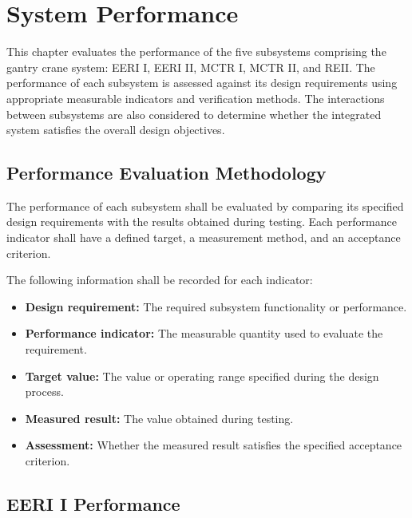 
\chapter{System Performance}
\label{ch:system-performance}

This chapter evaluates the performance of the five subsystems
comprising the gantry crane system: EERI I, EERI II, MCTR I,
MCTR II, and REII. The performance of each subsystem is assessed
against its design requirements using appropriate measurable
indicators and verification methods. The interactions between
subsystems are also considered to determine whether the integrated
system satisfies the overall design objectives.

\section{Performance Evaluation Methodology}
\label{sec:performance-methodology}

The performance of each subsystem shall be evaluated by comparing
its specified design requirements with the results obtained during
testing. Each performance indicator shall have a defined target,
a measurement method, and an acceptance criterion.

The following information shall be recorded for each indicator:
\begin{itemize}
    \item \textbf{Design requirement:} The required subsystem
    functionality or performance.
    \item \textbf{Performance indicator:} The measurable quantity
    used to evaluate the requirement.
    \item \textbf{Target value:} The value or operating range
    specified during the design process.
    \item \textbf{Measured result:} The value obtained during testing.
    \item \textbf{Assessment:} Whether the measured result satisfies
    the specified acceptance criterion.
\end{itemize}

\section{EERI I Performance}
\label{sec:eeri-i-performance}

